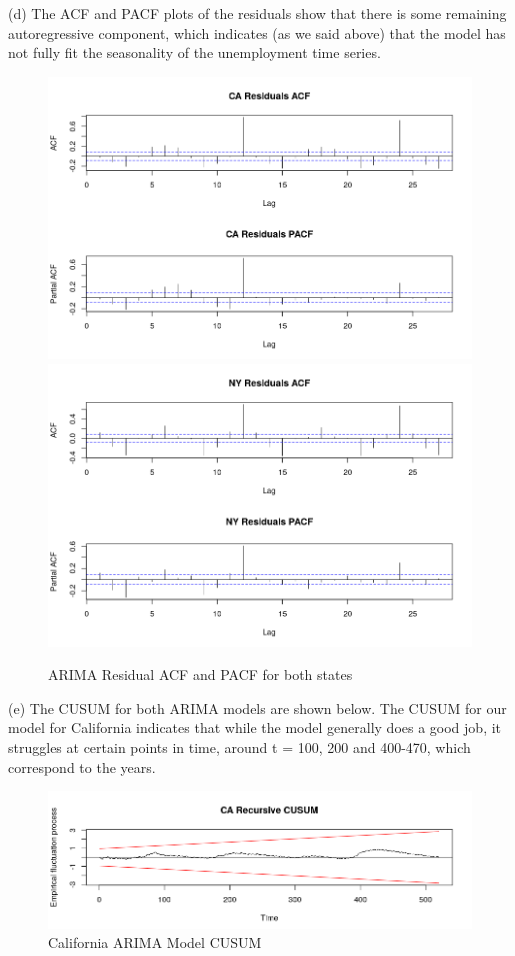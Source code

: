 \documentclass{article}
\begin{document}
\noindent (d) The ACF and PACF plots of the residuals show that there is some remaining autoregressive component, which indicates (as we said above) that the model has not fully fit the seasonality of the unemployment time series. 
 \begin{figure}[H]
	
	\includegraphics[width=380pt]{ca_residuals_acf}
	\includegraphics[width=380pt]{ny_residuals_acf}
	\caption{ARIMA Residual ACF and PACF for both states} 
\end{figure}


\noindent (e) The CUSUM for both ARIMA models are shown below. The CUSUM for our model for California indicates that while the model generally does a good job, it struggles at certain points in time, around t = 100, 200 and 400-470, which correspond to the years. 


\begin{figure}[H]
	
	\includegraphics[width=\linewidth]{ca_cusum}
	\caption{California ARIMA Model CUSUM } 
\end{figure}
\end{document}
